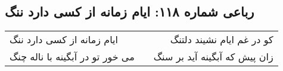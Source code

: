 \begin{center}
\section*{رباعی شماره ۱۱۸: ایام زمانه از کسی دارد ننگ}
\label{sec:sh118}
\begin{longtable}{l p{0.5cm} r}
ایام زمانه از کسی دارد ننگ
&&
کو در غم ایام نشیند دلتنگ
\\
می خور تو در آبگینه با ناله چنگ
&&
زان پیش که آبگینه آید بر سنگ
\\
\end{longtable}
\end{center}
